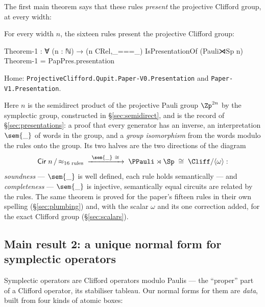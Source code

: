 The first main theorem says that these rules \emph{present} the
projective Clifford group, at every width:

\begin{theorem}\label{thm:main}
For every width $n$, the sixteen rules present the projective Clifford
group:
\begin{agdacode}
Theorem-1 : ∀ (n : ℕ) → (n CRel,_===_) IsPresentationOf (Pauli⋊Sp n)
Theorem-1 = PapPres.presentation
\end{agdacode}
\noindent Home: \texttt{ProjectiveClifford.Qupit.Paper-V0.Presentation}
and \texttt{Paper-V1.Presentation}.
\end{theorem}

Here \;$n$ is the semidirect product of the projective
Pauli group $\Zp^{2n}$ by the symplectic group, constructed in
\S\ref{sec:semidirect}, and  is the record
of \S\ref{sec:presentations}: a proof that every generator has an
inverse, an interpretation $\sem{\_}$ of words in the group, and a
\emph{group isomorphism} from the words modulo the rules onto the group.
Its two halves are the two directions of the diagram
\[
  \mathsf{Cir}\;n \,/\, {\approx_{\text{16 rules}}}
  \;\xrightarrow{\ \sem{\_}\ \cong\ }\;
  \PPauli \rtimes \Sp \;\cong\; \Cliff/\langle\omega\rangle :
\]
\emph{soundness} --- $\sem{\_}$ is well defined, each rule holds
semantically --- and \emph{completeness} --- $\sem{\_}$ is injective,
semantically equal circuits are related by the rules.  The same theorem
is proved for the paper's fifteen rules in their own spelling
(\S\ref{sec:plumbing}) and, with the scalar $\omega$ and its one
correction added, for the exact Clifford group (\S\ref{sec:scalars}).

\subsection{Main result 2: a unique normal form for symplectic operators}

Symplectic operators are Clifford operators modulo Paulis --- the
``proper'' part of a Clifford operator, its stabiliser tableau.  Our
normal forms for them are \emph{data}, built from four kinds of atomic
boxes:

